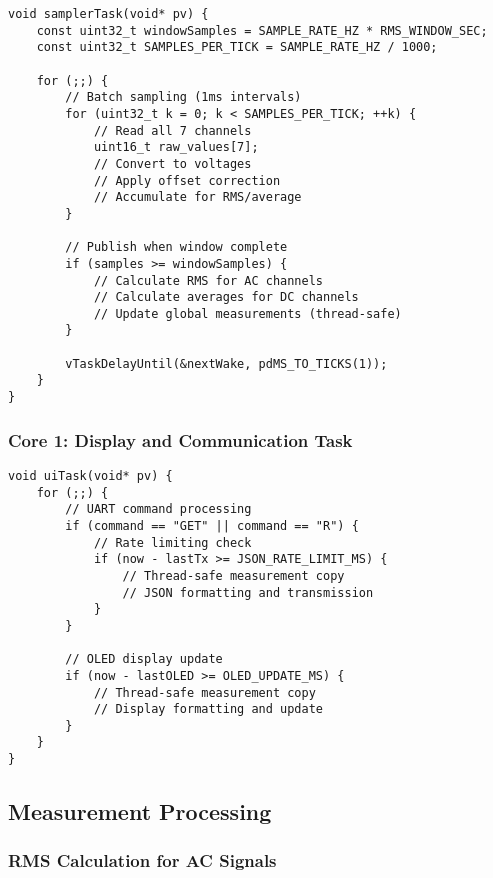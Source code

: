 \documentclass[11pt,a4paper]{article}
\begin{document}
\begin{lstlisting}[caption=High-Rate Sampling Task]
void samplerTask(void* pv) {
    const uint32_t windowSamples = SAMPLE_RATE_HZ * RMS_WINDOW_SEC;
    const uint32_t SAMPLES_PER_TICK = SAMPLE_RATE_HZ / 1000;
    
    for (;;) {
        // Batch sampling (1ms intervals)
        for (uint32_t k = 0; k < SAMPLES_PER_TICK; ++k) {
            // Read all 7 channels
            uint16_t raw_values[7];
            // Convert to voltages
            // Apply offset correction
            // Accumulate for RMS/average
        }
        
        // Publish when window complete
        if (samples >= windowSamples) {
            // Calculate RMS for AC channels
            // Calculate averages for DC channels
            // Update global measurements (thread-safe)
        }
        
        vTaskDelayUntil(&nextWake, pdMS_TO_TICKS(1));
    }
}
\end{lstlisting}

\subsubsection{Core 1: Display and Communication Task}

\begin{lstlisting}[caption=Display and Communication Task]
void uiTask(void* pv) {
    for (;;) {
        // UART command processing
        if (command == "GET" || command == "R") {
            // Rate limiting check
            if (now - lastTx >= JSON_RATE_LIMIT_MS) {
                // Thread-safe measurement copy
                // JSON formatting and transmission
            }
        }
        
        // OLED display update
        if (now - lastOLED >= OLED_UPDATE_MS) {
            // Thread-safe measurement copy
            // Display formatting and update
        }
    }
}
\end{lstlisting}

\subsection{Measurement Processing}

\subsubsection{RMS Calculation for AC Signals}
\end{document}
